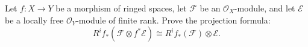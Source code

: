 Let $f: X \to Y$ be a morphism of ringed spaces, let $\mathcal{F}$ be an $\mathcal{O}_X$-module, and let $\mathcal{E}$ be a locally free $\mathcal{O}_Y$-module of finite rank. Prove the projection formula:
$$R^i f_*(\mathcal{F} \otimes f^*\mathcal{E}) \cong R^i f_*(\mathcal{F}) \otimes \mathcal{E}.$$
